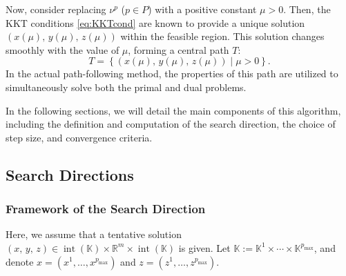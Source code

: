 \documentclass{scrartcl}
\begin{document}
\medskip

Now, consider replacing $\nu^p$ ($p \in P$) with a positive constant $\mu > 0$. Then, the KKT conditions \eqref{eq:KKTcond} are known to provide a unique solution $\left( x(\mu),\, y(\mu),\, z(\mu) \right)$ within the feasible region. This solution changes smoothly with the value of $\mu$, forming a central path $T$:
\[
  T = \left\{ \left( x(\mu),\, y(\mu),\, z(\mu) \right) \mid \mu > 0 \right\}.
\]
In the actual path-following method, the properties of this path are utilized to simultaneously solve both the primal and dual problems.

\medskip

In the following sections, we will detail the main components of this algorithm, including the definition and computation of the search direction, the choice of step size, and convergence criteria.



\bigskip
\subsection{Search Directions} \label{sec:direction}

\subsubsection{Framework of the Search Direction}

Here, we assume that a tentative solution $(x,\,y,\,z) \in \operatorname{int}(\mathbb{K}) \times \mathbb{R}^m \times \operatorname{int}(\mathbb{K})$ is given.
Let $\mathbb{K} := \mathbb{K}^1 \times \cdots \times \mathbb{K}^{p_{\max}}$, and denote $x = (x^1, \ldots, x^{p_{\max}})$ and $z = (z^1, \ldots, z^{p_{\max}})$.
\end{document}
